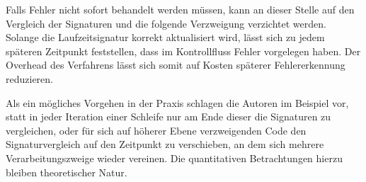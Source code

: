 \documentclass[11pt]{article}
\begin{document}
Falls Fehler nicht sofort behandelt werden müssen, kann an dieser Stelle auf
den Vergleich der Signaturen und die folgende Verzweigung verzichtet werden.
Solange die Laufzeitsignatur korrekt aktualisiert wird, lässt sich zu jedem
späteren Zeitpunkt feststellen, dass im Kontrollfluss Fehler vorgelegen haben.
Der Overhead des Verfahrens lässt sich somit auf Kosten späterer
Fehlererkennung reduzieren.

Als ein mögliches Vorgehen in der Praxis schlagen die Autoren im Beispiel vor,
statt in jeder Iteration einer Schleife nur am Ende dieser die Signaturen zu
vergleichen, oder für sich auf höherer Ebene verzweigenden Code den
Signaturvergleich auf den Zeitpunkt zu verschieben, an dem sich mehrere
Verarbeitungszweige wieder vereinen. Die quantitativen Betrachtungen hierzu
bleiben theoretischer Natur.

\pagebreak


\end{document}
